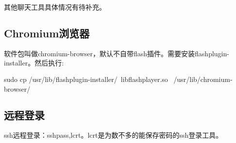 其他聊天工具具体情况有待补充。

\subsection{Chromium浏览器}
软件包叫做chromium-browser，默认不自带flash插件。需要安装flashplugin-installer。然后执行:
\begin{shellcmd}
    sudo cp /usr/lib/flashplugin-installer/\
    libflashplayer.so \ 
    /usr/lib/chromium-browser/
\end{shellcmd}

\subsection{远程登录}
ssh远程登录：sshpass,lcrt。lcrt是为数不多的能保存密码的ssh登录工具。

